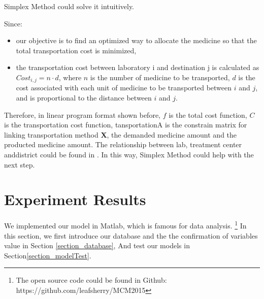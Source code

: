 \documentclass[12pt,a4paper,titlepage]{article}
\begin{document}
Simplex Method could solve it intuitively.

Since:
\begin{itemize}
    \item our objective is to find an optimized way to allocate the medicine so that the total transportation cost is minimized,
    \item the transportation cost between laboratory i and destination j is calculated as $Cost_{i,j}=n\cdot d$, where $n$ is the number of medicine to be transported, $d$ is the cost associated with each unit of medicine to be transported between $i$ and $j$, and is proportional to the distance between $i$ and $j$. 
\end{itemize}

Therefore, in linear program format shown before, $f$ is the total cost function, $C$ is the transportation cost function, tansportationA is the constrain matrix for linking transportation method \textbf{X}, the demanded medicine amount and the producted medicine amount. The relationship between lab, treatment center anddistrict could be found in \cite{ebolaReport20140204}. In this way, Simplex Method could help with the next step. 


\section{Experiment Results}
\label{section_experiment}

We implemented our model in Matlab, which is famous for data analysis. \footnote{The open source code could be found in Github: https://github.com/leafsherry/MCM2015}
In this section, we first introduce our database and the  the confirmation of variables value in Section \ref{section_database}, And test our models in Section\ref{section_modelTest}.
\end{document}
